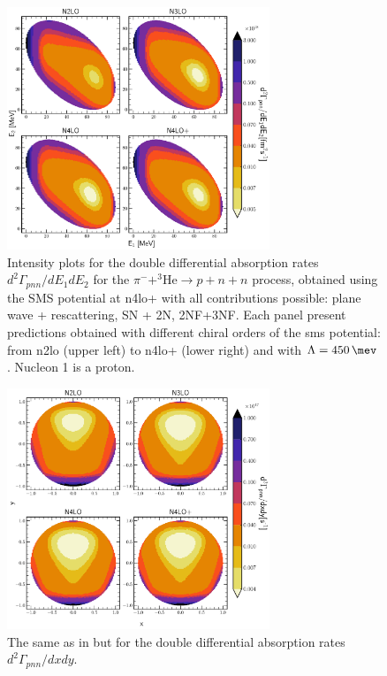     \begin{figure}[h]
        \begin{center}
            \includegraphics[width=0.7\textwidth]{PlotData/PION/Dalitz_maps/figures/Dalitz_map_pnn_E1E2_orders.pdf}
        \end{center}
        \caption{Intensity plots for the double differential absorption rates
        $d^2 \Gamma_{pnn}/dE_1dE_2$ for the $\pi^- + ^3\text{He} \rightarrow p + n + n$
        process, obtained using the SMS potential at \gls{n4lo+}
        with all contributions possible: plane wave + rescattering, SN + 2N, 2NF+3NF.
        Each panel present predictions obtained with different chiral orders of the \gls{sms} potential:
        from \gls{n2lo} (upper left) to \gls{n4lo+} (lower right) and with $\Lambda = \SI{450}{\mev}$.
        Nucleon 1 is a proton.}
        \label{pion_map_E1E2_order}
    \end{figure}

    \begin{figure}[h]
        \begin{center}
        \includegraphics[width=0.7\textwidth]{PlotData/PION/Dalitz_maps/figures/Dalitz_map_pnn_xy_orders.pdf}
        \end{center}
        \caption{The same as in  but for the double differential absorption rates
        $d^2 \Gamma_{pnn}/dxdy$.}
        \label{pion_map_xy_order}
    \end{figure}

